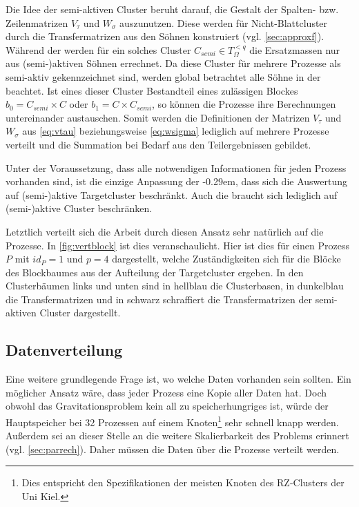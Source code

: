     Die Idee der semi-aktiven Cluster beruht darauf, die Gestalt der Spalten- bzw. Zeilenmatrizen $V_\tau$ und $W_\sigma$ auszunutzen. Diese werden für Nicht-Blattcluster durch die Transfermatrizen 
    aus den Söhnen konstruiert (vgl. \autoref{sec:approxf}). Während der \vorw werden für ein solches Cluster $C_{semi} \in T_\Omega^{<q}$ die Ersatzmassen nur aus (semi-)aktiven Söhnen
    errechnet. Da diese Cluster für mehrere Prozesse als semi-aktiv gekennzeichnet sind, werden global betrachtet alle Söhne in der \vorw beachtet. Ist eines dieser Cluster Bestandteil
    eines zulässigen Blockes $b_0 = C_{semi} \times C$ oder $b_1 = C \times C_{semi}$, so können die Prozesse ihre Berechnungen untereinander austauschen. Somit werden die Definitionen der Matrizen
    $V_\tau$ und $W_\sigma$ aus \autoref{eq:vtau} beziehungsweise \autoref{eq:wsigma} lediglich auf mehrere Prozesse verteilt und die Summation bei Bedarf aus den Teilergebnissen gebildet.
    
    Unter der Voraussetzung, dass alle notwendigen Informationen für jeden Prozess vorhanden sind, ist die einzige Anpassung der \koppl \kern-0.29em, dass sich die Auswertung auf (semi-)aktive
    Targetcluster beschränkt. Auch die \ruckw braucht sich lediglich auf (semi-)aktive Cluster beschränken.
    
    Letztlich verteilt sich die Arbeit durch diesen Ansatz sehr natürlich auf die Prozesse. In \autoref{fig:vertblock} ist dies veranschaulicht. Hier ist dies für einen Prozess $P$ mit $id_P = 1$ 
    und $p = 4$ dargestellt, welche Zuständigkeiten sich für die Blöcke des Blockbaumes aus der Aufteilung der Targetcluster ergeben. In den Clusterbäumen links und unten sind in hellblau die 
    Clusterbasen, in dunkelblau die Transfermatrizen und in schwarz schraffiert die Transfermatrizen der semi-aktiven Cluster dargestellt.
  
  \subsection{Datenverteilung}
  \label{sec:data}
    
    Eine weitere grundlegende Frage ist, wo welche Daten vorhanden sein sollten. Ein möglicher Ansatz wäre, dass jeder Prozess eine Kopie aller Daten hat. Doch obwohl das Gravitationsproblem kein all
    zu speicherhungriges ist, würde der Hauptspeicher bei 32 Prozessen auf einem Knoten\footnote{Dies entspricht den Spezifikationen der meisten Knoten des RZ-Clusters der Uni Kiel.}  sehr schnell 
    knapp werden. Außerdem sei an dieser Stelle an die weitere Skalierbarkeit des Problems erinnert (vgl. \autoref{sec:parrech}). Daher müssen die Daten über die Prozesse verteilt werden. 
    
